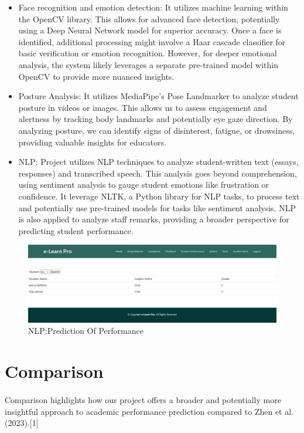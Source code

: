 \begin{itemize}
    \item Face recognition and emotion detection: It utilizes machine learning within the OpenCV library. This allows for advanced face detection, potentially using a Deep Neural Network model for superior accuracy. Once a face is identified, additional processing might involve a Haar cascade classifier for basic verification or emotion recognition. However, for deeper emotional analysis, the system likely leverages a separate pre-trained model within OpenCV to provide more nuanced insights.
    \item Posture Analysis: It utilizes MediaPipe's Pose Landmarker to analyze student posture in videos or images. This allows us to assess engagement and alertness by tracking body landmarks and potentially eye gaze direction. By analyzing posture, we can identify signs of disinterest, fatigue, or drowsiness, providing valuable insights for educators.
    \item NLP: Project utilizes NLP techniques to analyze student-written text (essays, responses) and transcribed speech. This analysis goes beyond comprehension, using sentiment analysis to gauge student emotions like frustration or confidence. It leverage NLTK, a Python library for NLP tasks, to process text and potentially use pre-trained models for tasks like sentiment analysis. NLP is also applied to analyze staff remarks, providing a broader perspective for predicting student performance.

\end{itemize}

\begin{figure}[!ht]
\centering
\includegraphics[width=125mm]{prediction and performance .png}
\caption{NLP:Prediction Of Performance}
\end{figure} 


\section{Comparison}
\paragraph{} Comparison highlights how our project offers a broader and potentially more insightful approach to academic performance prediction compared to Zhen et al. (2023).[1]

